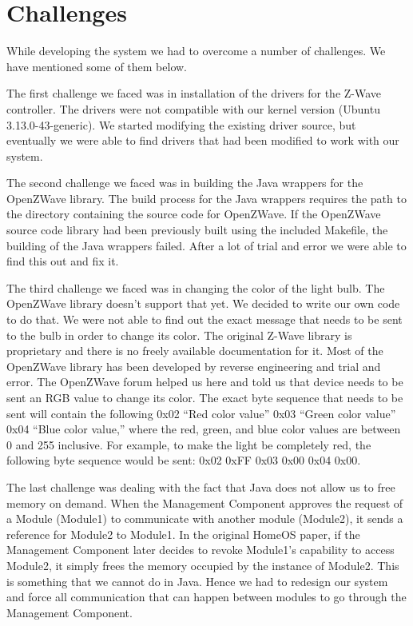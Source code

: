 \section{Challenges}
\label{sec:challenges}
While developing the system we had to overcome a number of challenges. We have 
mentioned some of them below.

The first challenge we faced was in installation of the drivers for the Z-Wave
controller. The drivers were not compatible with our kernel version (Ubuntu 
3.13.0-43-generic). We started modifying the existing driver source, but 
eventually we were able to find drivers that had been modified to work with our
system.

The second challenge we faced was in building the Java wrappers for the
OpenZWave library. The build process for the Java wrappers requires the path to
the directory containing the source code for OpenZWave. If the OpenZWave
source code library had been previously built using the included Makefile, the
building of the Java wrappers failed. After a lot of trial and error we were
able to find this out and fix it.

The third challenge we faced was in changing the color of the light bulb. The
OpenZWave library doesn't support that yet. We decided to write our own code to
do that. We were not able to find out the exact message that needs to be sent to
the bulb in order to change its color. The original Z-Wave library is
proprietary and there is no freely available documentation for it. Most of the 
OpenZWave library has been developed by reverse engineering and trial and error.
The OpenZWave forum helped us here and told us that device needs to be sent an
RGB value to change its color. The exact byte sequence that needs to be sent
will contain the following 0x02 ``Red color value'' 0x03 ``Green color value''
0x04 ``Blue color value,'' where the red, green, and blue color values are
between 0 and 255 inclusive. For example, to make the light be completely red,
the following byte sequence would be sent: 0x02 0xFF 0x03 0x00 0x04 0x00.

The last challenge was dealing with the fact that Java does not allow us to free
memory on demand. When the Management Component approves the request of a Module
(Module1) to communicate with another module (Module2), it sends a reference for
Module2 to Module1. In the original HomeOS paper, if the Management Component
later decides to revoke Module1's capability to access Module2, it simply frees
the memory occupied by the instance of Module2. This is something that we
cannot do in Java. Hence we had to redesign our system and force all
communication that can happen between modules to go through the
Management Component.
